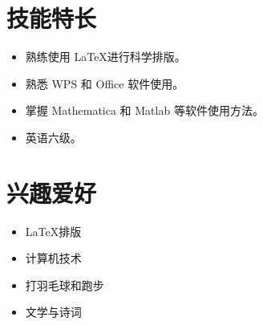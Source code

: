 \documentclass[zihao=-4,a4paper,fontset=none]{ctexart}
\newlength{\iconwidth}
\begin{document}

    
    
    \begin{minipage}[t]{0.6\textwidth}
        \section[技能特长]{\makebox[\iconwidth][c]{\color{main}{\faWrench}}\quad 技能特长}
        \begin{itemize}
        \setlength{\itemsep}{0.5em}
            \item 熟练使用 \LaTeX 进行科学排版。
            \item 熟悉 WPS 和 Office 软件使用。
            \item 掌握 Mathematica 和 Matlab 等软件使用方法。
            \item 英语六级。
        \end{itemize}
    \end{minipage}
    \hfill
    \begin{minipage}[t]{0.35\textwidth}
        \section[兴趣爱好]{\makebox[\iconwidth][c]{\color{main}{\faStar}}\quad 兴趣爱好}
        \begin{itemize}
        \setlength{\itemsep}{0.5em}
            \item \LaTeX 排版
            \item 计算机技术
            \item 打羽毛球和跑步
            \item 文学与诗词
        \end{itemize}
    \end{minipage}
\end{document}
